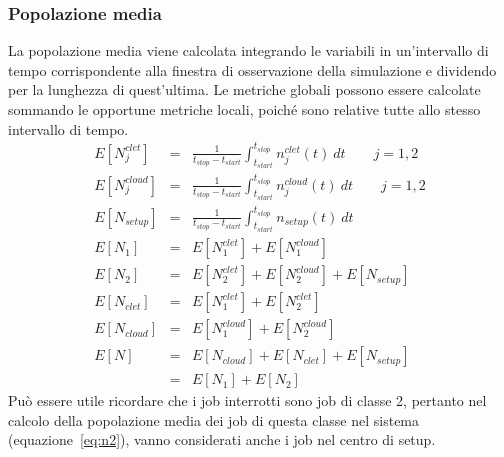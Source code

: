 \subsubsection{Popolazione media}
La popolazione media viene calcolata integrando le variabili in un'intervallo di 
tempo corrispondente alla finestra di osservazione della simulazione e dividendo
per la lunghezza di quest'ultima. Le metriche globali possono essere calcolate
sommando le opportune metriche locali, poiché sono relative tutte allo stesso
intervallo di tempo.
\begin{eqnarray}
\label{eq:njclet}
E[N_j^{clet}] & = &
\frac{1}{t_{stop} - t_{start}} 
\displaystyle \int_{t_{start}}^{t_{stop}} n_j^{clet}(t) \ dt
\qquad j = 1, 2 
\\[10pt]
\label{eq:njcloud}
E[N_j^{cloud}] & = &
\frac{1}{t_{stop} - t_{start}} 
\displaystyle \int_{t_{start}}^{t_{stop}} n_j^{cloud}(t) \ dt
\qquad j = 1, 2 
\\[10pt]
\label{eq:nsetup}
E[N_{setup}] & = &
\frac{1}{t_{stop} - t_{start}} 
\displaystyle \int_{t_{start}}^{t_{stop}} n_{setup}(t) \ dt
\\[10pt]
\label{eq:n1}
E[N_{1}] & = & E[N_1^{clet}] + E[N_1^{cloud}]
\\[10pt]
\label{eq:n2}
E[N_{2}] & = & E[N_2^{clet}] + E[N_2^{cloud}] + E[N_{setup}]
\\[10pt]
\label{eq:nclet}
E[N_{clet}] & = & E[N_1^{clet}] + E[N_2^{clet}]
\\[10pt]
\label{eq:ncloud}
E[N_{cloud}] & = & E[N_1^{cloud}] + E[N_2^{cloud}]
\\[10pt]
\label{eq:n}
E[N] & = & E[N_{cloud}] + E[N_{clet}] + E[N_{setup}] 
\\   & = & E[N_{1}] + E[N_{2}]
\end{eqnarray}
%
Può essere utile ricordare che i job interrotti sono job di classe 2, pertanto
nel calcolo della popolazione media dei job di questa classe nel sistema
(equazione~\ref{eq:n2}), vanno considerati anche i job nel centro di setup.
%

